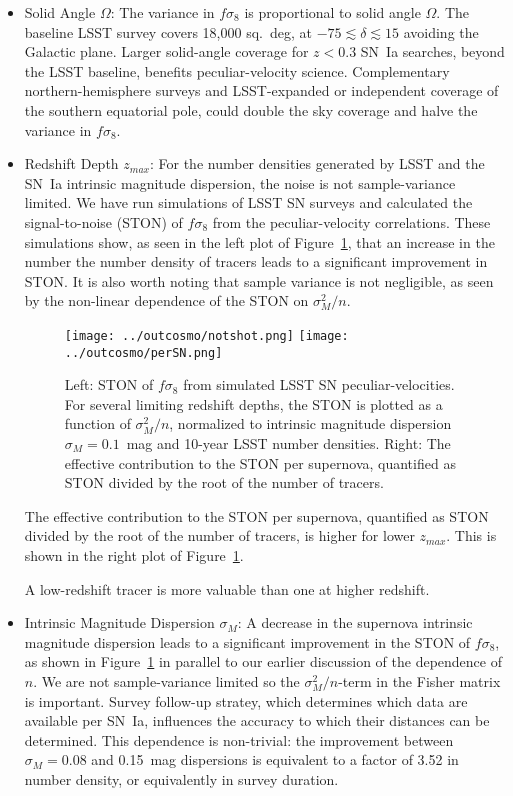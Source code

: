 \documentclass{aastex62}   	%
\begin{document}
\begin{itemize}
\item Solid Angle $\Omega$:
The variance in $f\sigma_8$ is proportional to solid angle $\Omega$.  The baseline
LSST survey covers 18,000 sq.~deg, at $-75 \lesssim \delta \lesssim15$ avoiding the Galactic plane.  Larger solid-angle coverage for $z<0.3$ SN~Ia searches, beyond
the LSST baseline, benefits peculiar-velocity science.  Complementary northern-hemisphere surveys and LSST-expanded or independent
coverage of the southern equatorial pole, could double
the sky coverage and halve the variance in $f\sigma_8$.
\item Redshift Depth $z_{max}$:
For the number densities generated by LSST and the SN~Ia intrinsic magnitude dispersion, the noise is not sample-variance
limited.  We have run simulations of LSST SN surveys
and calculated the signal-to-noise (STON) of $f\sigma_8$ from the peculiar-velocity correlations. These simulations show, as seen in the left plot
of  Figure~\ref{notshot:fig}, that an increase in the number the number density of tracers leads to a significant improvement in STON.
It is also worth noting that sample variance is not negligible, as seen by the non-linear dependence of the  STON on $\sigma_M^2/n$. 

\begin{figure}
\centering
\texttt{[image: ../outcosmo/notshot.png]}
\texttt{[image: ../outcosmo/perSN.png]}
\caption{Left: STON of $f\sigma_8$ from simulated LSST SN peculiar-velocities.  For several limiting redshift depths, the STON is plotted as a
function of $\sigma_M^2/n$, normalized to intrinsic magnitude dispersion $\sigma_M=0.1$~mag and 10-year LSST number densities.
Right: The effective contribution to the STON per supernova, quantified as STON divided by the root of the number of tracers.
\label{notshot:fig}}
\end{figure}

The effective contribution to the STON per supernova, quantified as STON divided by the root of the number of tracers, is higher for lower
$z_{max}$.  This is shown in the
right plot of   Figure~\ref{notshot:fig}.

A low-redshift tracer is more valuable than one at higher redshift.

\item Intrinsic Magnitude Dispersion $\sigma_M$:
A decrease in the supernova intrinsic magnitude dispersion leads to a significant improvement in  the STON of $f\sigma_8$,
as shown in Figure~\ref{notshot:fig} in parallel to our earlier discussion of the dependence of $n$.  We are not sample-variance
limited so the $\sigma^2_M/n$-term
in the Fisher matrix is important.
Survey follow-up stratey,
which determines which data are available per SN~Ia, influences the accuracy to which their distances can be determined. 
This dependence is non-trivial: the improvement between $\sigma_M=0.08$ and 0.15~mag dispersions is equivalent to a factor of 3.52
 in number density, or equivalently in survey duration. 
 

\end{itemize}
\end{document}
